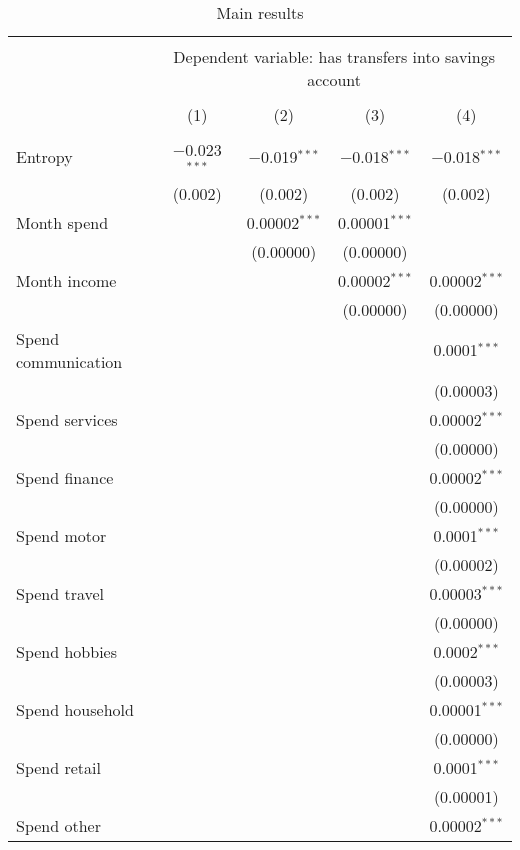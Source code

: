 
\begin{table}[!htbp] \centering 
  \caption{Main results} 
  \label{tab:main_results} 
\begin{tabular}{@{\extracolsep{5pt}}lcccc} 
\\[-1.8ex]\hline 
\hline \\[-1.8ex] 
 & \multicolumn{4}{c}{Dependent variable: has transfers into savings account} \\ 
\cline{2-5} 
\\[-1.8ex] & (1) & (2) & (3) & (4)\\ 
\hline \\[-1.8ex] 
 Entropy & $-$0.023$^{***}$ & $-$0.019$^{***}$ & $-$0.018$^{***}$ & $-$0.018$^{***}$ \\ 
  & (0.002) & (0.002) & (0.002) & (0.002) \\ 
  Month spend &  & 0.00002$^{***}$ & 0.00001$^{***}$ &  \\ 
  &  & (0.00000) & (0.00000) &  \\ 
  Month income &  &  & 0.00002$^{***}$ & 0.00002$^{***}$ \\ 
  &  &  & (0.00000) & (0.00000) \\ 
  Spend communication &  &  &  & 0.0001$^{***}$ \\ 
  &  &  &  & (0.00003) \\ 
  Spend services &  &  &  & 0.00002$^{***}$ \\ 
  &  &  &  & (0.00000) \\ 
  Spend finance &  &  &  & 0.00002$^{***}$ \\ 
  &  &  &  & (0.00000) \\ 
  Spend motor &  &  &  & 0.0001$^{***}$ \\ 
  &  &  &  & (0.00002) \\ 
  Spend travel &  &  &  & 0.00003$^{***}$ \\ 
  &  &  &  & (0.00000) \\ 
  Spend hobbies &  &  &  & 0.0002$^{***}$ \\ 
  &  &  &  & (0.00003) \\ 
  Spend household &  &  &  & 0.00001$^{***}$ \\ 
  &  &  &  & (0.00000) \\ 
  Spend retail &  &  &  & 0.0001$^{***}$ \\ 
  &  &  &  & (0.00001) \\ 
  Spend other &  &  &  & 0.00002$^{***}$ \\ 

\end{tabular}
\end{table}
